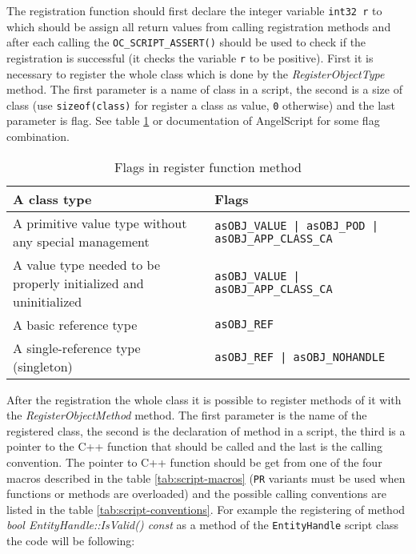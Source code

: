 The registration function should first declare the integer variable \verb/int32 r/ to which should be assign all return values from calling registration methods and after each calling the \verb/OC_SCRIPT_ASSERT()/ should be used to check if the registration is successful (it checks the variable \verb/r/ to be positive). First it is necessary to register the whole class which is done by the \emph{RegisterObjectType} method. The first parameter is a name of class in a script, the second is a size of class (use \verb/sizeof(class)/ for register a class as value, \verb/0/ otherwise) and the last parameter is flag. See table \ref{tab:script-objecttype} or documentation of AngelScript \cite{angelscript} for some flag combination.

\begin{table}[htbp]
	\centering
		{\scriptsize
		\begin{tabular}{|p{0.43\hsize}|p{0.50\hsize}|}
		\hline
		A class type & Flags\\
		\hline
		A primitive value type without any special management & \verb/asOBJ_VALUE | asOBJ_POD | asOBJ_APP_CLASS_CA/\\
		A value type needed to be properly initialized and uninitialized & \verb/asOBJ_VALUE | asOBJ_APP_CLASS_CA/\\
		A basic reference type & \verb/asOBJ_REF/\\
		A single-reference type (singleton) & \verb/asOBJ_REF | asOBJ_NOHANDLE/\\
		\hline
		\end{tabular}
		}
	\caption{Flags in register function method}
	\label{tab:script-objecttype}
\end{table}

After the registration the whole class it is possible to register methods of it with the \emph{RegisterObjectMethod} method. The first parameter is the name of the registered class, the second is the declaration of method in a script, the third is a pointer to the C++ function that should be called and the last is the calling convention. The pointer to C++ function should be get from one of the four macros described in the table \ref{tab:script-macros} (\verb/PR/ variants must be used when functions or methods are overloaded) and the possible calling conventions are listed in the table \ref{tab:script-conventions}. For example the registering of method \emph{bool EntityHandle::IsValid() const} as a method of the \verb/EntityHandle/ script class the code will be following:

